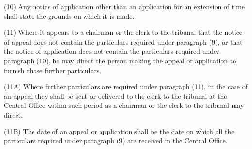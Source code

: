 \documentclass[a4paper]{article}
\begin{document}
(10) Any notice of 
application other than an application for an extension of time shall state the grounds on which it is made.


(11) Where it appears to a chairman or the clerk to the tribunal that the notice of appeal does not contain the particulars required under paragraph (9), or that the notice of application does not contain the particulars required under paragraph (10), he may direct the person making the appeal or application to furnish those further particulars.

(11A) Where further particulars are required under paragraph (11), in the case of an appeal they shall be sent or delivered to the clerk to the tribunal at the Central Office within such period as a chairman or the clerk to the tribunal may direct.

(11B) The date of an appeal or application shall be the date on which all the particulars required under paragraph (9) are received in the Central Office.
\end{document}
